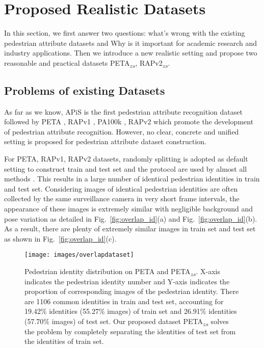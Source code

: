 \documentclass[runningheads]{llncs}
\begin{document}
\section{Proposed Realistic Datasets} \label{dataset}

In this section, we first answer two questions: what's wrong with the existing pedestrian attribute datasets and Why is it important for academic research and industry applications. Then we introduce a new realistic setting and propose two reasonable and practical datasets PETA\textsubscript{$zs$}, RAPv2\textsubscript{$zs$}.

\subsection{Problems of existing Datasets}

As far as we know, APiS \cite{zhu2013pedestrian} is the first pedestrian attribute recognition dataset followed by PETA \cite{deng2014pedestrian}, RAPv1 \cite{li2016richly}, PA100k \cite{liu2017hydraplus}, RAPv2 \cite{li2018richly} which promote the development of pedestrian attribute recognition. However, no clear, concrete and unified setting is proposed for pedestrian attribute dataset construction. 

For PETA, RAPv1, RAPv2 datasets, randomly splitting is adopted as default setting to construct train and test set and the protocol are used by almost all methods \cite{li2016richly,liu2017hydraplus,wang2017attribute,li2018richly,sarafianos2018deep,guo2019visual,tang2019Improving}. This results in a large number of identical pedestrian identities in train and test set.
Considering images of identical pedestrian identities are often collected by the same surveillance camera in very short frame intervals, the appearance of these images is extremely similar with negligible background and pose variation as detailed in Fig.~\ref{fig:overlap_id}(a) and Fig.~\ref{fig:overlap_id}(b).
As a result, there are plenty of extremely similar images in train set and test set as shown in Fig.~\ref{fig:overlap_id}(c).

\begin{figure}[h]
\centering
\texttt{[image: images/overlapdataset]}
\caption{Pedestrian identity distribution on PETA and PETA\textsubscript{$zs$}. X-axis indicates the pedestrian identity number and Y-axis indicates the proportion of corresponding images of the pedestrian identity. There are 1106 common identities in train and test set, accounting for 19.42\% identities (55.27\% images) of train set and 26.91\% identities (57.70\% images) of test set. Our proposed dataset PETA\textsubscript{$zs$} solves the problem by completely separating the identities of test set from the identities of train set.}
\label{fig:overlap_dataset}
\end{figure}
\end{document}
